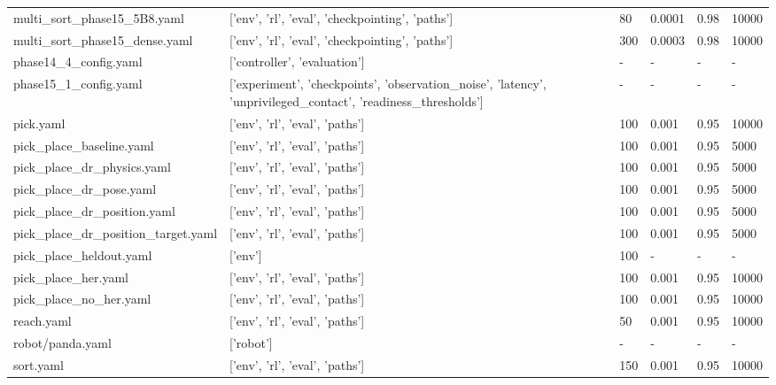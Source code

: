 \documentclass[11pt,a4paper,oneside]{book}
\begin{document}
\begin{longtable}{l l l l l l}
multi\_sort\_phase15\_5B8.yaml & ['env', 'rl', 'eval', 'checkpointing', 'paths'] & 80 & 0.0001 & 0.98 & 10000 \\
multi\_sort\_phase15\_dense.yaml & ['env', 'rl', 'eval', 'checkpointing', 'paths'] & 300 & 0.0003 & 0.98 & 10000 \\
phase14\_4\_config.yaml & ['controller', 'evaluation'] & - & - & - & - \\
phase15\_1\_config.yaml & ['experiment', 'checkpoints', 'observation\_noise', 'latency', 'unprivileged\_contact', 'readiness\_thresholds'] & - & - & - & - \\
pick.yaml & ['env', 'rl', 'eval', 'paths'] & 100 & 0.001 & 0.95 & 10000 \\
pick\_place\_baseline.yaml & ['env', 'rl', 'eval', 'paths'] & 100 & 0.001 & 0.95 & 5000 \\
pick\_place\_dr\_physics.yaml & ['env', 'rl', 'eval', 'paths'] & 100 & 0.001 & 0.95 & 5000 \\
pick\_place\_dr\_pose.yaml & ['env', 'rl', 'eval', 'paths'] & 100 & 0.001 & 0.95 & 5000 \\
pick\_place\_dr\_position.yaml & ['env', 'rl', 'eval', 'paths'] & 100 & 0.001 & 0.95 & 5000 \\
pick\_place\_dr\_position\_target.yaml & ['env', 'rl', 'eval', 'paths'] & 100 & 0.001 & 0.95 & 5000 \\
pick\_place\_heldout.yaml & ['env'] & 100 & - & - & - \\
pick\_place\_her.yaml & ['env', 'rl', 'eval', 'paths'] & 100 & 0.001 & 0.95 & 10000 \\
pick\_place\_no\_her.yaml & ['env', 'rl', 'eval', 'paths'] & 100 & 0.001 & 0.95 & 10000 \\
reach.yaml & ['env', 'rl', 'eval', 'paths'] & 50 & 0.001 & 0.95 & 10000 \\
robot/panda.yaml & ['robot'] & - & - & - & - \\
sort.yaml & ['env', 'rl', 'eval', 'paths'] & 150 & 0.001 & 0.95 & 10000 \\
\bottomrule \end{longtable}
\end{document}
